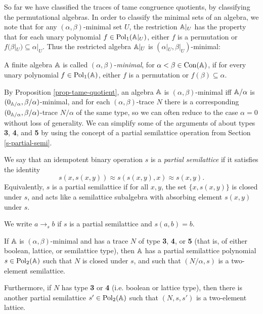 \begin{appendices}
So far we have classified the traces of tame congruence quotients, by classifying the permutational algebras. In order to classify the minimal sets of an algebra, we note that for any $(\alpha,\beta)$-minimal set $U$, the restriction $\mathbb{A}|_U$ has the property that for each unary polynomial $f \in \operatorname{Pol}_1(\mathbb{A}|_U)$, either $f$ is a permutation or $f(\beta|_U) \subseteq \alpha|_U$. Thus the restricted algebra $\mathbb{A}|_U$ is $(\alpha|_U,\beta|_U)$-minimal:

\begin{defn} A finite algebra $\mathbb{A}$ is called $(\alpha,\beta)$-\emph{minimal}, for $\alpha < \beta \in \operatorname{Con}(\mathbb{A})$, if for every unary polynomial $f \in \operatorname{Pol}_1(\mathbb{A})$, either $f$ is a permutation or $f(\beta) \subseteq \alpha$.
\end{defn}

By Proposition \ref{prop-tame-quotient}, an algebra $\mathbb{A}$ is $(\alpha,\beta)$-minimal iff $\mathbb{A}/\alpha$ is $(0_{\mathbb{A}/\alpha}, \beta/\alpha)$-minimal, and for each $(\alpha,\beta)$-trace $N$ there is a corresponding $(0_{\mathbb{A}/\alpha},\beta/\alpha)$-trace $N/\alpha$ of the same type, so we can often reduce to the case $\alpha = 0$ without loss of generality. We can simplify some of the arguments of \cite{hobby-mckenzie} about types \textbf{3}, \textbf{4}, and \textbf{5} by using the concept of a partial semilattice operation from Section \ref{s-partial-semi}.

\begin{defn} We say that an idempotent binary operation $s$ is a \emph{partial semilattice} if it satisfies the identity
\[
s(x,s(x,y)) \approx s(s(x,y),x) \approx s(x,y).
\]
Equivalently, $s$ is a partial semilattice if for all $x,y$, the set $\{x,s(x,y)\}$ is closed under $s$, and acts like a semilattice subalgebra with absorbing element $s(x,y)$ under $s$.

We write $a \rightarrow_s b$ if $s$ is a partial semilattice and $s(a,b) = b$.
\end{defn}

\begin{prop}\label{prop-tame-partial-semi} If $\mathbb{A}$ is $(\alpha,\beta)$-minimal and has a trace $N$ of type \textbf{3}, \textbf{4}, or \textbf{5} (that is, of either boolean, lattice, or semilattice type), then $\mathbb{A}$ has a partial semilattice polynomial $s \in \operatorname{Pol}_2(\mathbb{A})$ such that $N$ is closed under $s$, and such that $(N/\alpha, s)$ is a two-element semilattice.

Furthermore, if $N$ has type  \textbf{3} or \textbf{4} (i.e. boolean or lattice type), then there is another partial semilattice $s' \in \operatorname{Pol}_2(\mathbb{A})$ such that $(N, s, s')$ is a two-element lattice.


\end{prop}
\end{appendices}
